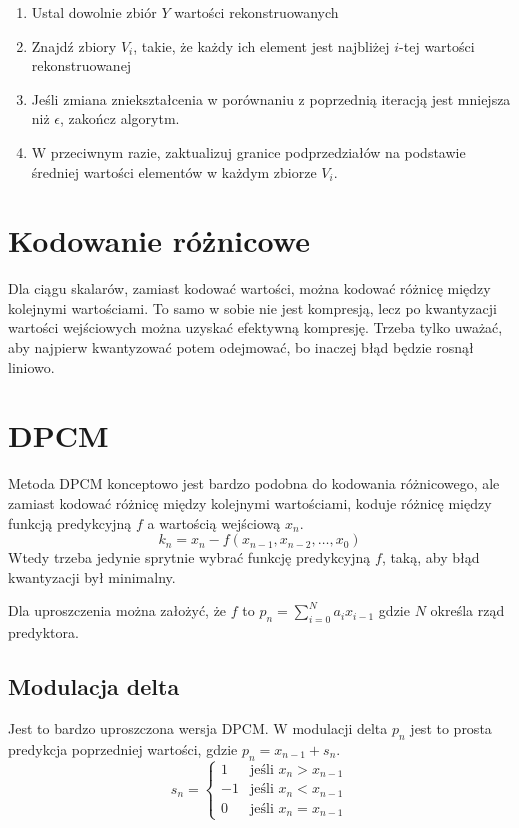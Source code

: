 \documentclass{../notatki}
\begin{document}
\begin{enumerate}
  \item Ustal dowolnie zbiór $Y$ wartości rekonstruowanych
  \item Znajdź zbiory $V_i$, takie, że każdy ich element jest najbliżej $i$-tej
    wartości rekonstruowanej
  \item Jeśli zmiana zniekształcenia w porównaniu z poprzednią iteracją
    jest mniejsza
    niż $\epsilon$, zakończ algorytm.
  \item W przeciwnym razie, zaktualizuj granice podprzedziałów na podstawie
    średniej wartości elementów w każdym zbiorze $V_i$.
\end{enumerate}

\section{Kodowanie różnicowe}

Dla ciągu skalarów, zamiast kodować wartości, można kodować różnicę między
kolejnymi wartościami. To samo w sobie nie jest kompresją, lecz po kwantyzacji
wartości wejściowych można uzyskać efektywną kompresję. Trzeba tylko uważać,
aby najpierw kwantyzować potem odejmować, bo inaczej błąd będzie rosnął liniowo.

\section{DPCM}

Metoda DPCM konceptowo jest bardzo podobna do kodowania różnicowego, ale zamiast
kodować różnicę między kolejnymi wartościami, koduje różnicę między funkcją
predykcyjną $f$ a wartością wejściową $x_n$.
$$
k_n = x_n -f(x_{n-1}, x_{n-2}, \dots, x_{0})
$$
Wtedy trzeba jedynie sprytnie wybrać funkcję predykcyjną $f$, taką, aby
błąd kwantyzacji był minimalny.

Dla uproszczenia można założyć, że $f$ to $p_n = \sum_{i=0}^{N} a_i x_{i - 1}$
gdzie $N$ określa rząd predyktora.

\subsection{Modulacja delta}

Jest to bardzo uproszczona wersja DPCM. W modulacji delta $p_n$ jest to
prosta predykcja poprzedniej wartości, gdzie $p_n = x_{n-1} + s_n$.
$$
s_n =
\begin{cases}
  1 & \text{jeśli } x_n > x_{n-1} \\
  -1 & \text{jeśli } x_n < x_{n-1} \\
  0 & \text{jeśli } x_n = x_{n-1}
\end{cases}
$$
\end{document}

